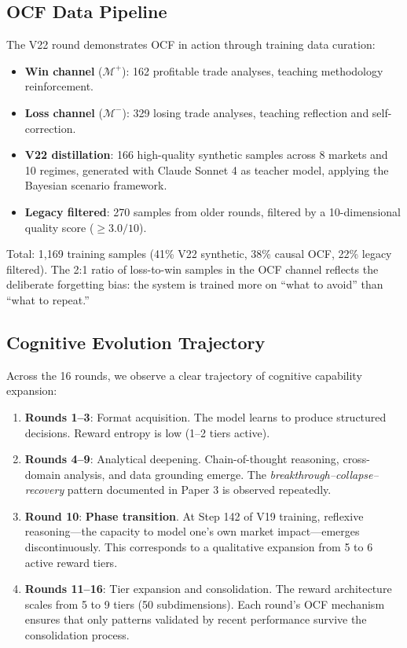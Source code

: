 \documentclass[11pt, a4paper]{article}
\begin{document}
\subsection{OCF Data Pipeline}

The V22 round demonstrates OCF in action through training data curation:

\begin{itemize}
  \item \textbf{Win channel} ($\mathcal{M}^+$): 162 profitable trade analyses, teaching methodology reinforcement.
  \item \textbf{Loss channel} ($\mathcal{M}^-$): 329 losing trade analyses, teaching reflection and self-correction.
  \item \textbf{V22 distillation}: 166 high-quality synthetic samples across 8 markets and 10 regimes, generated with Claude Sonnet 4 as teacher model, applying the Bayesian scenario framework.
  \item \textbf{Legacy filtered}: 270 samples from older rounds, filtered by a 10-dimensional quality score ($\geq 3.0/10$).
\end{itemize}

Total: 1,169 training samples (41\% V22 synthetic, 38\% causal OCF, 22\% legacy filtered). The 2:1 ratio of loss-to-win samples in the OCF channel reflects the deliberate forgetting bias: the system is trained more on ``what to avoid'' than ``what to repeat.''

\subsection{Cognitive Evolution Trajectory}

Across the 16 rounds, we observe a clear trajectory of cognitive capability expansion:

\begin{enumerate}
  \item \textbf{Rounds 1--3}: Format acquisition. The model learns to produce structured decisions. Reward entropy is low (1--2 tiers active).
  
  \item \textbf{Rounds 4--9}: Analytical deepening. Chain-of-thought reasoning, cross-domain analysis, and data grounding emerge. The \emph{breakthrough--collapse--recovery} pattern documented in Paper 3 is observed repeatedly.
  
  \item \textbf{Round 10}: \textbf{Phase transition}. At Step 142 of V19 training, reflexive reasoning---the capacity to model one's own market impact---emerges discontinuously. This corresponds to a qualitative expansion from 5 to 6 active reward tiers.
  
  \item \textbf{Rounds 11--16}: Tier expansion and consolidation. The reward architecture scales from 5 to 9 tiers (50 subdimensions). Each round's OCF mechanism ensures that only patterns validated by recent performance survive the consolidation process.
\end{enumerate}
\end{document}
